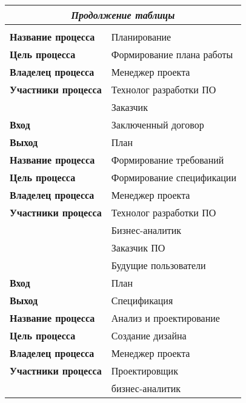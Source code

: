 \documentclass[a4paper,14pt]{extarticle}
\begin{document}
\vspace{3ex}
\begin{longtable}{|l|l|}

	\endfirsthead
	
	\hline
	\multicolumn{2}{|c|}{\textit{Продолжение таблицы}}\\
	\hline
	\endhead
	
	\hline
	\endfoot
	
	
	\hline
	\multicolumn{2}{| c |}{\textit{Конец таблицы}}\\
	\hline\hline
	\endlastfoot

	\hline
	\textbf{Название процесса} & Планирование \\ \hline
	\textbf{Цель процесса} & Формирование плана работы \\ \hline
	\textbf{Владелец процесса} & Менеджер проекта \\ \hline
	\multicolumn{ 1}{|c|}{\textbf{Участники процесса}} & Технолог разработки ПО \\ \cline{ 2- 2}
	\multicolumn{ 1}{|l|}{} & Заказчик \\ \hline
	\textbf{Вход} & Заключенный договор \\ \hline
	\textbf{Выход} & План \\ \hline
	\textbf{Название процесса} & Формирование требований \\ \hline
	\textbf{Цель процесса} & Формирование спецификации \\ \hline
	\textbf{Владелец процесса} & Менеджер проекта \\ \hline
	\multicolumn{ 1}{|c|}{\textbf{Участники процесса}} & Технолог разработки ПО \\ \cline{ 2- 2}
	\multicolumn{ 1}{|l|}{} & Бизнес-аналитик \\ \cline{ 2- 2}
	\multicolumn{ 1}{|l|}{} & Заказчик ПО \\ \cline{ 2- 2}
	\multicolumn{ 1}{|l|}{} & Будущие пользователи \\ \hline
	\textbf{Вход} & План \\ \hline
	\textbf{Выход} & Спецификация \\ \hline
	\textbf{Название процесса} & Анализ и проектирование \\ \hline
	\textbf{Цель процесса} & Создание дизайна \\ \hline
	\textbf{Владелец процесса} & Менеджер проекта \\ \hline
	\multicolumn{ 1}{|c|}{\textbf{Участники процесса}} & Проектировщик \\ \cline{ 2- 2}
	\multicolumn{ 1}{|l|}{} & бизнес-аналитик \\ \cline{ 2- 2}

\end{longtable}
\end{document}
